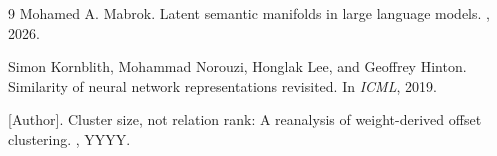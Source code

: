 \documentclass{article}
\begin{document}

\begin{thebibliography}{9}
	Mohamed A. Mabrok.
	\newblock Latent semantic manifolds in large language models.
	, 2026.

	Simon Kornblith, Mohammad Norouzi, Honglak Lee, and Geoffrey Hinton.
	\newblock Similarity of neural network representations revisited.
	\newblock In {\em ICML}, 2019.

	[Author].
	\newblock Cluster size, not relation rank: A reanalysis of weight-derived offset clustering.
	\newblock [Manuscript], YYYY.
\end{thebibliography}
\end{document}
